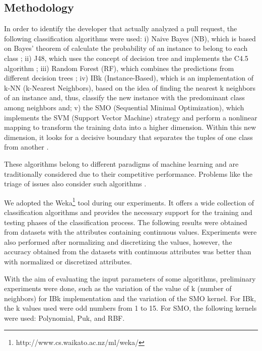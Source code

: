 \documentclass{sig-alternate}
\begin{document}
\subsection{Methodology}
In order to identify the developer that actually analyzed a pull request, the following classification algorithms were used: i) Naive Bayes (NB), which is based on Bayes' theorem of calculate the probability of an instance to belong to each class \cite{han_data_2011, john_estimating_1995}; ii) J48, which uses the concept of decision tree and implements the C4.5 algorithm \cite{quinlan_c4.5:_1993}; iii) Random Forest (RF), which combines the predictions from different decision trees \cite{breiman_random_2001}; iv) IBk (Instance-Based), which is an implementation of k-NN (k-Nearest Neighbors), based on the idea of finding the nearest k neighbors of an instance and, thus, classify the new instance with the predominant class among neighbors \cite{aha_instance-based_1991, han_data_2011} and; v) the SMO (Sequential Minimal Optimization), which implements the SVM (Support Vector Machine) strategy and perform a nonlinear mapping to transform the training data into a higher dimension. Within this new dimension, it looks for a decisive boundary that separates the tuples of one class from another \cite{han_data_2011}. 

These algorithms belong to different paradigms of machine learning and are traditionally considered due to their competitive performance. Problems like the triage of issues also consider such algorithms \cite{lessmann_benchmarking_2008}.

We adopted the Weka\footnote[1]{http://www.cs.waikato.ac.nz/ml/weka/} tool during our experiments. It offers a wide collection of classification algorithms and provides the necessary support for the training and testing phases of the classification process. The following results were obtained from datasets with the attributes containing continuous values. Experiments were also performed after normalizing and discretizing the values, however, the accuracy obtained from the datasets with continuous attributes was better than with normalized or discretized attributes. 

With the aim of evaluating the input parameters of some algorithms, preliminary experiments were done, such as the variation of the value of k (number of neighbors) for IBk implementation and the variation of the SMO kernel. For IBk, the k values used were odd numbers from 1 to 15. For SMO, the following kernels were used: Polynomial, Puk, and RBF.
\end{document}
